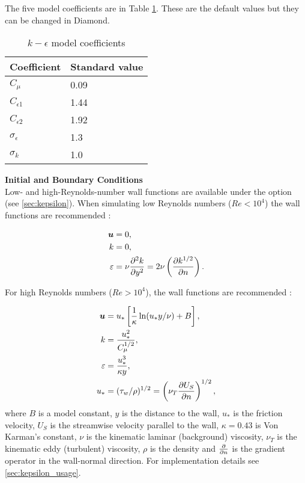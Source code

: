 The five model coefficients are in Table \ref{tab:kepsco}. These are the default values but they can be changed in Diamond.

\begin{table}[hb]
\begin{center}
\begin{tabular}{ll}\hline
Coefficient & Standard value \\ \hline
$C_\mu$ & 0.09 \\
$C_{\epsilon1}$ & 1.44 \\
$C_{\epsilon2}$ & 1.92 \\
$\sigma_\epsilon$ & 1.3 \\
$\sigma_k$ & 1.0 \\ \hline
\end{tabular}
\end{center}
\caption{$k-\epsilon$ model coefficients}
\label{tab:kepsco}
\end{table}

\par{\textbf{Initial and Boundary Conditions}\\}
Low- and high-Reynolds-number wall functions are available under the option \linebreak {} (see \ref{sec:kepsilon}). When simulating low Reynolds numbers ($Re<10^4$) the  wall functions are recommended \citep{wilcox1998turbulence}:

\begin{align}
\bmu &= 0, \label{ubc1}\\
k &= 0, \label{kbc1}\\
\epsilon &= \nu \ppxx[y]{k} = 2 \nu \left ( \ppx[n]{k^{1/2}} \right ). \label{epsbc1}
\end{align}

For high Reynolds numbers ($Re>10^4$), the  wall functions are recommended \citep{wilcox1998turbulence}:

\begin{align}
\bmu &= u_* \left [ \frac{1}{\kappa} \ln (u_* y / \nu) + B \right ], \label{ubc2}\\
k &= \frac{u_*^2}{C_{\mu}^{1/2}}, \label{kbc2}\\
\epsilon &= \frac{u_*^3}{\kappa y}, \label{epsbc2}\\
u_* &= (\tau_w / \rho)^{1/2} = \left ( \nu_T \ppx[n]{U_S} \right )^{1/2}, \label{ustar}
\end{align}
where $B$ is a model constant, $y$ is the distance to the wall, $u_*$ is the friction
velocity, $U_S$ is the streamwise velocity parallel to the wall, $\kappa=0.43$ is Von
Karman's constant, $\nu$ is the kinematic laminar (background) viscosity, $\nu_T$ is the
kinematic eddy (turbulent) viscosity, $\rho$ is the density and $\ppx[n]{}$ is the
gradient operator in the wall-normal direction. For implementation details see
\ref{sec:kepsilon_usage}.

